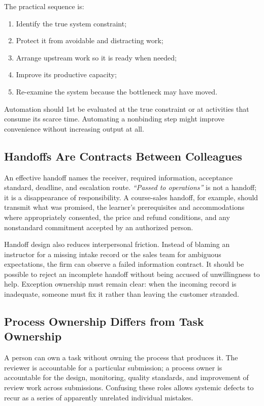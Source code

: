 The practical sequence is:
\begin{enumerate}
    \item Identify the true system constraint;
    \item Protect it from avoidable and distracting work;
    \item Arrange upstream work so it is ready when needed;
    \item Improve its productive capacity;
    \item Re-examine the system because the bottleneck may have moved.
\end{enumerate}

Automation should 1st be evaluated at the true constraint or at activities that consume its scarce time. Automating a nonbinding step might improve convenience without increasing output at all.

\subsection{Handoffs Are Contracts Between Colleagues}
\label{sec:handoffs_as_contracts}

An effective handoff names the receiver, required information, acceptance standard, deadline, and escalation route. \textit{``Passed to operations''} is not a handoff; it is a disappearance of responsibility. A course-sales handoff, for example, should transmit what was promised, the learner's prerequisites and accommodations where appropriately consented, the price and refund conditions, and any nonstandard commitment accepted by an authorized person.

Handoff design also reduces interpersonal friction. Instead of blaming an instructor for a missing intake record or the sales team for ambiguous expectations, the firm can observe a failed information contract. It should be possible to reject an incomplete handoff without being accused of unwillingness to help. Exception ownership must remain clear: when the incoming record is inadequate, someone must fix it rather than leaving the customer stranded.

\subsection{Process Ownership Differs from Task Ownership}
\label{sec:process_vs_task_ownership}

A person can own a task without owning the process that produces it. The reviewer is accountable for a particular submission; a process owner is accountable for the design, monitoring, quality standards, and improvement of review work across submissions. Confusing these roles allows systemic defects to recur as a series of apparently unrelated individual mistakes.

